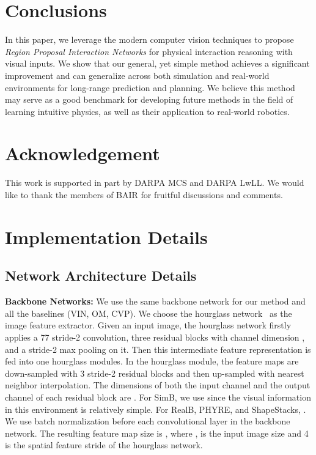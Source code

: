 \documentclass{article} \usepackage{iclr2021_conference,times}
\begin{document}
\vspace{-0.7em}
\section{Conclusions}
\vspace{-0.7em}
In this paper, we leverage the modern computer vision techniques to propose \textit{Region Proposal Interaction Networks} for physical interaction reasoning with visual inputs. We show that our general, yet simple method achieves a significant improvement and can generalize across both simulation and real-world environments for long-range prediction and planning. We believe this method may serve as a good benchmark for developing future methods in the field of learning intuitive physics, as well as their application to real-world robotics.

\section*{Acknowledgement}
This work is supported in part by DARPA MCS and DARPA LwLL.
We would like to thank the members of BAIR for fruitful discussions and comments.




\clearpage
\appendix

\section{Implementation Details}

\subsection{Network Architecture Details}

\textbf{Backbone Networks:} We use the same backbone network for our method and all the baselines (VIN, OM, CVP). We choose the hourglass network~\citep{newell2016stacked} as the image feature extractor. Given an input image, the hourglass network firstly applies a 77 stride-2 convolution, three residual blocks with channel dimension , and a stride-2 max pooling on it. Then this intermediate feature representation is fed into one hourglass modules. In the hourglass module, the feature maps are down-sampled with 3 stride-2 residual blocks and then up-sampled with nearest neighbor interpolation. The dimensions of both the input channel and the output channel of each residual block are . For SimB, we use  since the visual information in this environment is relatively simple. For RealB, PHYRE, and ShapeStacks, . We use batch normalization before each convolutional layer in the backbone network. The resulting feature map size is , where ,  is the input image size and 4 is the spatial feature stride of the hourglass network.
\end{document}
